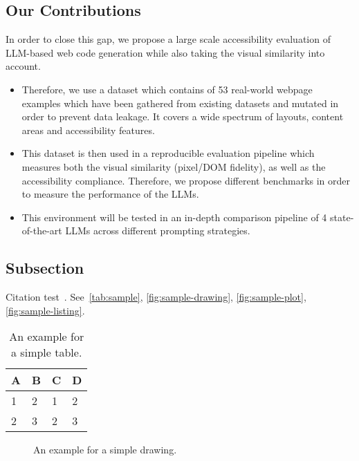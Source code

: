 \subsection{Our Contributions}
In order to close this gap, we propose a large scale accessibility evaluation of LLM-based
web code generation while also taking the visual similarity into account. 
\begin{itemize}
  \item Therefore, we use a dataset which contains of 53 real-world webpage 
  examples which have been gathered from existing datasets and mutated in 
  order to prevent data leakage. It covers a wide spectrum of layouts, content 
  areas and accessibility features.
  \item This dataset is then used in a reproducible evaluation pipeline which 
  measures both the visual similarity (pixel/DOM fidelity), as well as the 
  accessibility compliance. Therefore, we propose different benchmarks in 
  order to measure the performance of the LLMs.
  \item This environment will be tested in an in-depth comparison pipeline of 4 
  state-of-the-art LLMs across different prompting strategies.
\end{itemize}









\subsection{Subsection}
Citation test~\parencite{latex}.
See~\autoref{tab:sample}, \autoref{fig:sample-drawing}, \autoref{fig:sample-plot}, \autoref{fig:sample-listing}.

\begin{table}[htpb]
  \caption[Example table]{An example for a simple table.}\label{tab:sample}
  \centering
  \begin{tabular}{l l l l}
    \toprule
      A & B & C & D \\
    \midrule
      1 & 2 & 1 & 2 \\
      2 & 3 & 2 & 3 \\
    \bottomrule
  \end{tabular}
\end{table}

\begin{figure}[htpb]
  \centering
  \caption[Example drawing]{An example for a simple drawing.}\label{fig:sample-drawing}
\end{figure}


